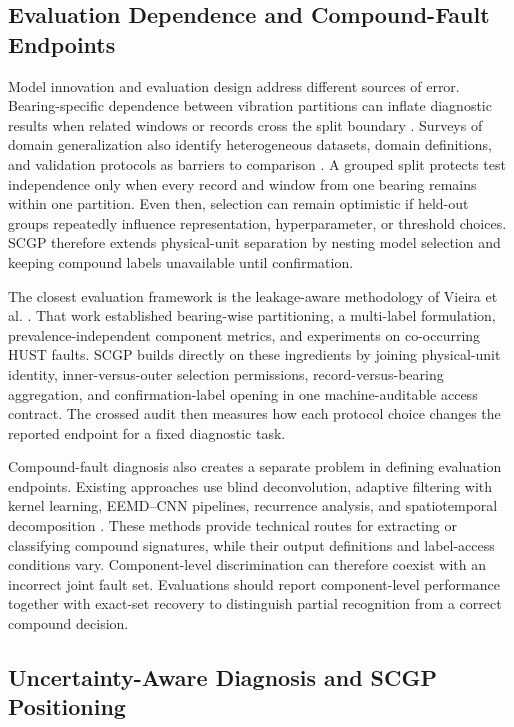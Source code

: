 \documentclass[machines,article,submit,oneauthor,pdftex]{Definitions/mdpi}
\begin{document}
\subsection{Evaluation Dependence and Compound-Fault Endpoints}

Model innovation and evaluation design address different sources of error. Bearing-specific dependence between vibration partitions can inflate diagnostic results when related windows or records cross the split boundary \cite{r32}. Surveys of domain generalization also identify heterogeneous datasets, domain definitions, and validation protocols as barriers to comparison \cite{r33,r34}. A grouped split protects test independence only when every record and window from one bearing remains within one partition. Even then, selection can remain optimistic if held-out groups repeatedly influence representation, hyperparameter, or threshold choices. SCGP therefore extends physical-unit separation by nesting model selection and keeping compound labels unavailable until confirmation.

The closest evaluation framework is the leakage-aware methodology of Vieira et al. \cite{r44}. That work established bearing-wise partitioning, a multi-label formulation, prevalence-independent component metrics, and experiments on co-occurring HUST faults. SCGP builds directly on these ingredients by joining physical-unit identity, inner-versus-outer selection permissions, record-versus-bearing aggregation, and confirmation-label opening in one machine-auditable access contract. The crossed audit then measures how each protocol choice changes the reported endpoint for a fixed diagnostic task.

Compound-fault diagnosis also creates a separate problem in defining evaluation endpoints. Existing approaches use blind deconvolution, adaptive filtering with kernel learning, EEMD--CNN pipelines, recurrence analysis, and spatiotemporal decomposition \cite{r25,r26,r27,r28,r35}. These methods provide technical routes for extracting or classifying compound signatures, while their output definitions and label-access conditions vary. Component-level discrimination can therefore coexist with an incorrect joint fault set. Evaluations should report component-level performance together with exact-set recovery to distinguish partial recognition from a correct compound decision.

\subsection{Uncertainty-Aware Diagnosis and SCGP Positioning}
\end{document}
